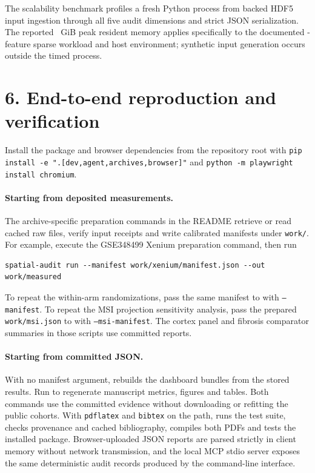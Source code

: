\documentclass[11pt]{article}
\begin{document}
The scalability benchmark profiles a fresh Python process from backed HDF5 input ingestion through all five audit dimensions and strict JSON serialization. The reported \RSSGiB{}~GiB peak resident memory applies specifically to the documented \MemoryFeatures{}-feature sparse workload and host environment; synthetic input generation occurs outside the timed process.

\section*{6. End-to-end reproduction and verification}
Install the package and browser dependencies from the repository root with \texttt{pip install -e ".[dev,agent,archives,browser]"} and \texttt{python -m playwright install chromium}.

\paragraph{Starting from deposited measurements.} The archive-specific preparation commands in the README retrieve or read cached raw files, verify input receipts and write calibrated manifests under \texttt{work/}. For example, execute the GSE348499 Xenium preparation command, then run
\begin{verbatim}
spatial-audit run --manifest work/xenium/manifest.json --out work/measured
\end{verbatim}
 To repeat the within-arm randomizations, pass the same manifest to  with \texttt{--manifest}. To repeat the MSI projection sensitivity analysis, pass the prepared \texttt{work/msi.json} to  with \texttt{--msi-manifest}. The cortex panel and fibrosis comparator summaries in those scripts use committed reports.

\paragraph{Starting from committed JSON.} With no manifest argument,  rebuilds the dashboard bundles from the stored results. Run  to regenerate manuscript metrics, figures and tables. Both commands use the committed evidence without downloading or refitting the public cohorts. With \texttt{pdflatex} and \texttt{bibtex} on the path,  runs the test suite, checks provenance and cached bibliography, compiles both PDFs and tests the installed package.
Browser-uploaded JSON reports are parsed strictly in client memory without network transmission, and the local MCP stdio server exposes the same deterministic audit records produced by the command-line interface.
\end{document}
